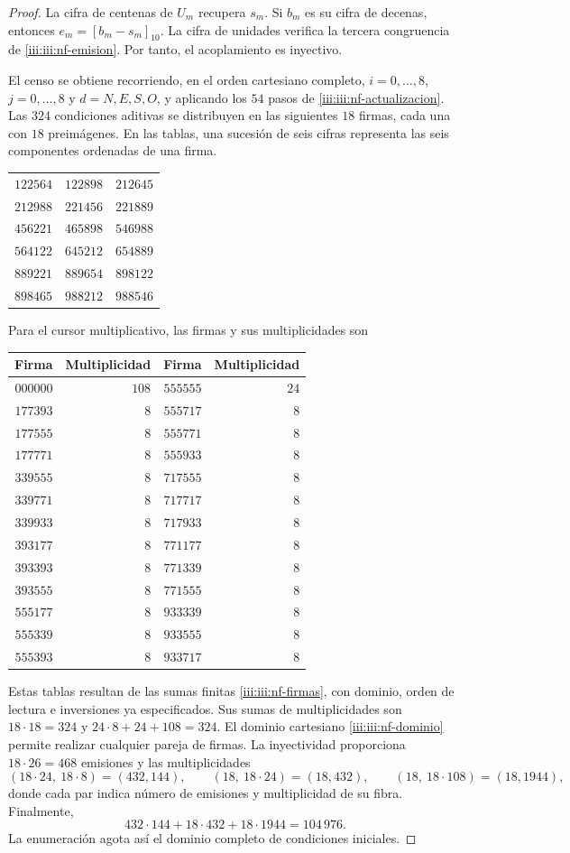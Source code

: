 \begin{proof}
La cifra de centenas de $U_m$ recupera $s_m$. Si $b_m$ es su cifra de
decenas, entonces $e_m=[b_m-s_m]_{10}$. La cifra de unidades verifica
la tercera congruencia de \eqref{iii:iii:nf-emision}. Por tanto, el
acoplamiento es inyectivo.

El censo se obtiene recorriendo, en el orden cartesiano completo,
$i=0,\ldots,8$, $j=0,\ldots,8$ y $d=N,E,S,O$, y aplicando los $54$
pasos de \eqref{iii:iii:nf-actualizacion}. Las $324$ condiciones aditivas
se distribuyen en las siguientes $18$ firmas, cada una con $18$
preimágenes. En las tablas, una sucesión de seis cifras representa
las seis componentes ordenadas de una firma.
\begin{center}
\begin{tabular}{ccc}
$122564$&$122898$&$212645$\\
$212988$&$221456$&$221889$\\
$456221$&$465898$&$546988$\\
$564122$&$645212$&$654889$\\
$889221$&$889654$&$898122$\\
$898465$&$988212$&$988546$
\end{tabular}
\end{center}
Para el cursor multiplicativo, las firmas y sus multiplicidades son
\begin{center}
\begin{tabular}{rr@{\qquad}rr}
Firma&Multiplicidad&Firma&Multiplicidad\\ \hline
$000000$&$108$&$555555$&$24$\\
$177393$&$8$&$555717$&$8$\\
$177555$&$8$&$555771$&$8$\\
$177771$&$8$&$555933$&$8$\\
$339555$&$8$&$717555$&$8$\\
$339771$&$8$&$717717$&$8$\\
$339933$&$8$&$717933$&$8$\\
$393177$&$8$&$771177$&$8$\\
$393393$&$8$&$771339$&$8$\\
$393555$&$8$&$771555$&$8$\\
$555177$&$8$&$933339$&$8$\\
$555339$&$8$&$933555$&$8$\\
$555393$&$8$&$933717$&$8$
\end{tabular}
\end{center}
Estas tablas resultan de las sumas finitas \eqref{iii:iii:nf-firmas}, con
dominio, orden de lectura e inversiones ya especificados. Sus sumas
de multiplicidades son $18\cdot18=324$ y
$24\cdot8+24+108=324$. El dominio cartesiano
\eqref{iii:iii:nf-dominio} permite realizar cualquier pareja de firmas.
La inyectividad proporciona $18\cdot26=468$ emisiones y las
multiplicidades
\[
 (18\cdot24,\ 18\cdot8)=(432,144),\qquad
 (18,\ 18\cdot24)=(18,432),\qquad
 (18,\ 18\cdot108)=(18,1944),
\]
donde cada par indica número de emisiones y multiplicidad de su fibra.
Finalmente,
\[
 432\cdot144+18\cdot432+18\cdot1944=104\,976.
\]
La enumeración agota así el dominio completo de condiciones iniciales.
\end{proof}

